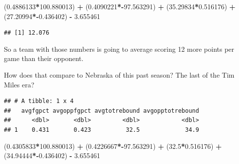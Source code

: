 \documentclass[]{book}
\newenvironment{Shaded}{\begin{snugshade}}{\end{snugshade}}
\newcommand{\KeywordTok}[1]{\textcolor[rgb]{0.13,0.29,0.53}{\textbf{#1}}}
\newcommand{\DataTypeTok}[1]{\textcolor[rgb]{0.13,0.29,0.53}{#1}}
\newcommand{\FloatTok}[1]{\textcolor[rgb]{0.00,0.00,0.81}{#1}}
\newcommand{\StringTok}[1]{\textcolor[rgb]{0.31,0.60,0.02}{#1}}
\newcommand{\OperatorTok}[1]{\textcolor[rgb]{0.81,0.36,0.00}{\textbf{#1}}}
\newcommand{\NormalTok}[1]{#1}
\begin{document}
\begin{Shaded}
\begin{Highlighting}[]
\NormalTok{(}\FloatTok{0.4886133}\OperatorTok{*}\FloatTok{100.880013}\NormalTok{) }\OperatorTok{+}\StringTok{ }\NormalTok{(}\FloatTok{0.4090221}\OperatorTok{*-}\FloatTok{97.563291}\NormalTok{) }\OperatorTok{+}\StringTok{ }\NormalTok{(}\FloatTok{35.29834}\OperatorTok{*}\FloatTok{0.516176}\NormalTok{) }\OperatorTok{+}\StringTok{ }\NormalTok{(}\FloatTok{27.20994}\OperatorTok{*-}\FloatTok{0.436402}\NormalTok{) }\OperatorTok{-}\StringTok{ }\FloatTok{3.655461}
\end{Highlighting}
\end{Shaded}

\begin{verbatim}
## [1] 12.076
\end{verbatim}

So a team with those numbers is going to average scoring 12 more points
per game than their opponent.

How does that compare to Nebraska of this past season? The last of the
Tim Miles era?

\begin{Shaded}
\end{Shaded}

\begin{verbatim}
## # A tibble: 1 x 4
##   avgfgpct avgoppfgpct avgtotrebound avgopptotrebound
##      <dbl>       <dbl>         <dbl>            <dbl>
## 1    0.431       0.423          32.5             34.9
\end{verbatim}

\begin{Shaded}
\begin{Highlighting}[]
\NormalTok{(}\FloatTok{0.4305833}\OperatorTok{*}\FloatTok{100.880013}\NormalTok{) }\OperatorTok{+}\StringTok{ }\NormalTok{(}\FloatTok{0.4226667}\OperatorTok{*-}\FloatTok{97.563291}\NormalTok{) }\OperatorTok{+}\StringTok{ }\NormalTok{(}\FloatTok{32.5}\OperatorTok{*}\FloatTok{0.516176}\NormalTok{) }\OperatorTok{+}\StringTok{ }\NormalTok{(}\FloatTok{34.94444}\OperatorTok{*-}\FloatTok{0.436402}\NormalTok{) }\OperatorTok{-}\StringTok{ }\FloatTok{3.655461}
\end{Highlighting}
\end{Shaded}
\end{document}

